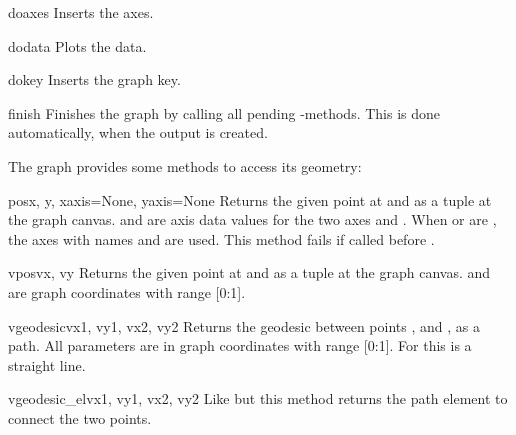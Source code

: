\begin{methoddesc}{doaxes}{}
  Inserts the axes.
\end{methoddesc}

\begin{methoddesc}{dodata}{}
  Plots the data.
\end{methoddesc}

\begin{methoddesc}{dokey}{}
  Inserts the graph key.
\end{methoddesc}

\begin{methoddesc}{finish}{}
  Finishes the graph by calling all pending -methods. This
  is done automatically, when the output is created.
\end{methoddesc}

The graph provides some methods to access its geometry:

\begin{methoddesc}{pos}{x, y, xaxis=None, yaxis=None}
  Returns the given point at  and  as a tuple
   at the graph canvas.  and  are
  axis data values for the two axes  and . When
   or  are , the axes with names
   and  are used. This method fails if called before
  .
\end{methoddesc}

\begin{methoddesc}{vpos}{vx, vy}
  Returns the given point at  and  as a tuple
   at the graph canvas.  and  are
  graph coordinates with range [0:1].
\end{methoddesc}

\begin{methoddesc}{vgeodesic}{vx1, vy1, vx2, vy2}
  Returns the geodesic between points ,  and
  ,  as a path. All parameters are in graph
  coordinates with range [0:1]. For  this is a straight
  line.
\end{methoddesc}

\begin{methoddesc}{vgeodesic\_el}{vx1, vy1, vx2, vy2}
  Like  but this method returns the path element to
  connect the two points.
\end{methoddesc}

